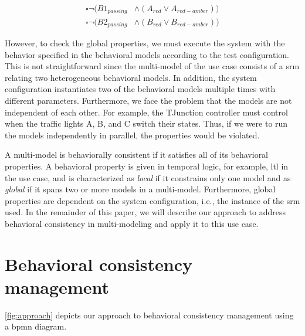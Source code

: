 \documentclass{jot}
\begin{document}
\begin{align}
    \square\neg(B1_{passing} & \land (A_{red} \lor A_{red-amber})) \label{eq:property3} \\
    \square\neg(B2_{passing} & \land (B_{red} \lor B_{red-amber})) \label{eq:property4}
\end{align}

However, to check the global properties, we must execute the system with the behavior specified in the behavioral models according to the test configuration.
This is not straightforward since the multi-model of the use case consists of a \gls*{srm} relating two heterogeneous behavioral models.
In addition, the system configuration instantiates two of the behavioral models multiple times with different parameters.
Furthermore, we face the problem that the models are not independent of each other.
For example, the TJunction controller must control when the traffic lights A, B, and C switch their states.
Thus, if we were to run the models independently in parallel, the properties would be violated.

A multi-model is behaviorally consistent if it satisfies all of its behavioral properties.
A behavioral property is given in temporal logic, for example, \gls*{ltl} in the use case, and is characterized as \emph{local} if it constrains only one model and as \emph{global} if it spans two or more models in a multi-model.
Furthermore, global properties are dependent on the system configuration, i.e., the instance of the \gls*{srm} used.
In the remainder of this paper, we will describe our approach to address behavioral consistency in multi-modeling and apply it to this use case.


\section{Behavioral consistency management} \label{sec:behavioral_consistency_checking}
\autoref{fig:approach} depicts our approach to behavioral consistency management using a \gls*{bpmn} diagram.
\end{document}
